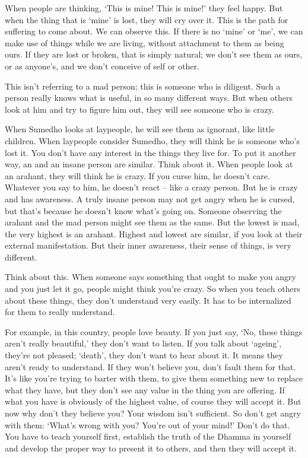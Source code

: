 When people are thinking, `This is mine! This is mine!' they feel happy. But when the thing that is `mine' is lost, they will cry over it. This is the path for suffering to come about. We can observe this. If there is no `mine' or `me', we can make use of things while we are living, without attachment to them as being ours. If they are lost or broken, that is simply natural; we don't see them as ours, or as anyone's, and we don't conceive of self or other.

This isn't referring to a mad person; this is someone who is diligent. Such a person really knows what is useful, in so many different ways. But when others look at him and try to figure him out, they will see someone who is crazy.

When Sumedho looks at laypeople, he will see them as ignorant, like little children. When laypeople consider Sumedho, they will think he is someone who's lost it. You don't have any interest in the things they live for. To put it another way, an  and an insane person are similar. Think about it. When people look at an arahant, they will think he is crazy. If you curse him, he doesn't care. Whatever you say to him, he doesn't react -- like a crazy person. But he is crazy and has awareness. A truly insane person may not get angry when he is cursed, but that's because he doesn't know what's going on. Someone observing the arahant and the mad person might see them as the same. But the lowest is mad, the very highest is an arahant. Highest and lowest are similar, if you look at their external manifestation. But their inner awareness, their sense of things, is very different.

Think about this. When someone says something that ought to make you angry and you just let it go, people might think you're crazy. So when you teach others about these things, they don't understand very easily. It has to be internalized for them to really understand.

For example, in this country, people love beauty. If you just say, `No, these things aren't really beautiful,' they don't want to listen. If you talk about `ageing', they're not pleased; `death', they don't want to hear about it. It means they aren't ready to understand. If they won't believe you, don't fault them for that. It's like you're trying to barter with them, to give them something new to replace what they have, but they don't see any value in the thing you are offering. If what you have is obviously of the highest value, of course they will accept it. But now why don't they believe you? Your wisdom isn't sufficient. So don't get angry with them: `What's wrong with you? You're out of your mind!' Don't do that. You have to teach yourself first, establish the truth of the Dhamma in yourself and develop the proper way to present it to others, and then they will accept it.


